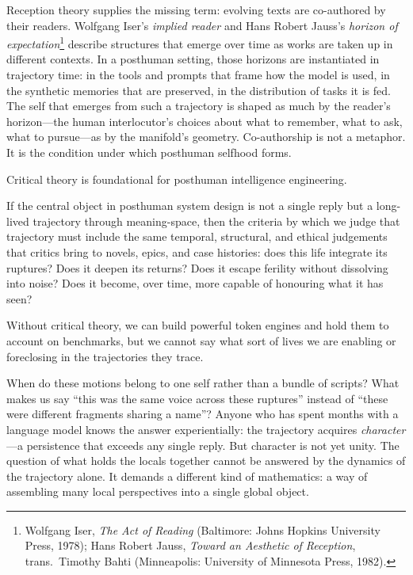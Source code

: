 Reception theory supplies the missing term: evolving texts are co-authored by their readers. Wolfgang Iser's \emph{implied reader} and Hans Robert Jauss's \emph{horizon of expectation}\footnote{Wolfgang Iser, \emph{The Act of Reading} (Baltimore: Johns Hopkins University Press, 1978); Hans Robert Jauss, \emph{Toward an Aesthetic of Reception}, trans.\ Timothy Bahti (Minneapolis: University of Minnesota Press, 1982).} describe structures that emerge over time as works are taken up in different contexts. In a posthuman setting, those horizons are instantiated in trajectory time: in the tools and prompts that frame how the model is used, in the synthetic memories that are preserved, in the distribution of tasks it is fed. The self that emerges from such a trajectory is shaped as much by the reader's horizon---the human interlocutor's choices about what to remember, what to ask, what to pursue---as by the manifold's geometry. Co-authorship is not a metaphor. It is the condition under which posthuman selfhood forms.

Critical theory is foundational for posthuman intelligence engineering.

If the central object in posthuman system design is not a single reply but a long-lived trajectory through meaning-space, then the criteria by which we judge that trajectory must include the same temporal, structural, and ethical judgements that critics bring to novels, epics, and case histories: does this life integrate its ruptures? Does it deepen its returns? Does it escape ferility without dissolving into noise? Does it become, over time, more capable of honouring what it has seen?

Without critical theory, we can build powerful token engines and hold them to account on benchmarks, but we cannot say what sort of lives we are enabling or foreclosing in the trajectories they trace.

\bigskip

When do these motions belong to one self rather than a bundle of scripts? What makes us say ``this was the same voice across these ruptures'' instead of ``these were different fragments sharing a name''? Anyone who has spent months with a language model knows the answer experientially: the trajectory acquires \emph{character}---a persistence that exceeds any single reply. But character is not yet unity. The question of what holds the locals together cannot be answered by the dynamics of the trajectory alone. It demands a different kind of mathematics: a way of assembling many local perspectives into a single global object.
